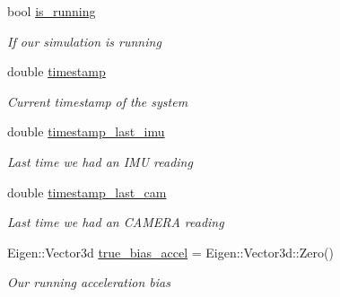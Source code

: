 \begin{DoxyCompactItemize}
bool \hyperlink{classov__init_1_1SimulatorInit_a8abb917e0f329e5d8602692a5f4c2776}{is\+\_\+running}
\begin{DoxyCompactList}\small\item\em If our simulation is running \end{DoxyCompactList}\item 
\mbox{\label{classov__init_1_1SimulatorInit_a69cfbc8778564611b8b81e5fdb1d5736}} 
double \hyperlink{classov__init_1_1SimulatorInit_a69cfbc8778564611b8b81e5fdb1d5736}{timestamp}
\begin{DoxyCompactList}\small\item\em Current timestamp of the system \end{DoxyCompactList}\item 
\mbox{\label{classov__init_1_1SimulatorInit_aad6608fa7e7a00ef588ec326c3f03729}} 
double \hyperlink{classov__init_1_1SimulatorInit_aad6608fa7e7a00ef588ec326c3f03729}{timestamp\+\_\+last\+\_\+imu}
\begin{DoxyCompactList}\small\item\em Last time we had an I\+MU reading \end{DoxyCompactList}\item 
\mbox{\label{classov__init_1_1SimulatorInit_ad35d52befdec1e430bdd13c49a418fc4}} 
double \hyperlink{classov__init_1_1SimulatorInit_ad35d52befdec1e430bdd13c49a418fc4}{timestamp\+\_\+last\+\_\+cam}
\begin{DoxyCompactList}\small\item\em Last time we had an C\+A\+M\+E\+RA reading \end{DoxyCompactList}\item 
\mbox{\label{classov__init_1_1SimulatorInit_ab3f60dfbc69a9b510d9278e9d21ef31e}} 
Eigen\+::\+Vector3d \hyperlink{classov__init_1_1SimulatorInit_ab3f60dfbc69a9b510d9278e9d21ef31e}{true\+\_\+bias\+\_\+accel} = Eigen\+::\+Vector3d\+::\+Zero()
\begin{DoxyCompactList}\small\item\em Our running acceleration bias \end{DoxyCompactList}\item 
\mbox{\label{classov__init_1_1SimulatorInit_a23a46e6cdbe66968bb6d4174a1aa6861}} 

\end{DoxyCompactItemize}
